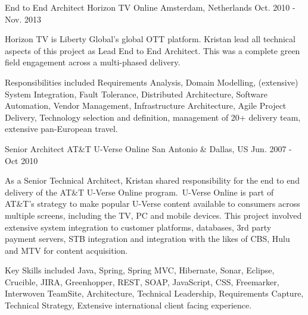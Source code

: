 


\begin{cventries}


\cventry
{End to End Architect} %
{Horizon TV Online} %
{Amsterdam, Netherlands} %
{Oct. 2010 - Nov. 2013} %
{ %
\begin{cvitems}
\item {Horizon TV is Liberty Global's global OTT platform. Kristan lead all technical aspects of this project as Lead End to End Architect. This was a complete green field engagement across a multi-phased delivery.}
\item {Responsibilities included Requirements Analysis, Domain Modelling, (extensive) System Integration, Fault Tolerance, Distributed Architecture, Software Automation, Vendor Management, Infrastructure Architecture, Agile Project Delivery, Technology selection and definition, management of 20+ delivery team, extensive pan-European travel.}
\end{cvitems}
}


\cventry
{Senior Architect} %
{AT\&T U-Verse Online} %
{San Antonio \& Dallas, US} %
{Jun. 2007 - Oct 2010} %
{ %
\begin{cvitems}
\item {As a Senior Technical Architect, Kristan shared responsibility for the end to end delivery of the AT\&T U-Verse Online program. U-Verse Online is part of AT\&T’s strategy to make popular U-Verse content available to consumers across multiple screens, including the TV, PC and mobile devices. This project involved extensive system integration to customer platforms, databases, 3rd party payment servers, STB integration and integration with the likes of CBS, Hulu and MTV for content acquisition.}
\item {Key Skills included Java, Spring, Spring MVC, Hibernate, Sonar, Eclipse, Crucible, JIRA, Greenhopper, REST, SOAP, JavaScript, CSS, Freemarker, Interwoven TeamSite, Architecture, Technical Leadership, Requirements Capture, Technical Strategy, Extensive international client facing experience.}
\end{cvitems}
}


\end{cventries}
